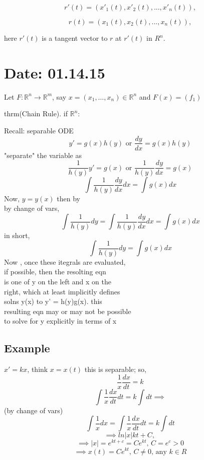   $$ r'(t) = (x'_1(t), x'_2(t), ... , x'_n(t)),$$ 
  
  $$ r(t) = (x_1(t), x_2(t), ... , x_n(t)),$$

  here $r'(t)$ is a tangent vector to $r$ at 
  $r'(t)$ in $R^n$.

\section{Date: 01.14.15}

  Let \( F: \mathbb{R}^n \to \mathbb{R}^m \), say \( x = (x_1, \dots ,
  x_n) \in \mathbb{R}^n  \) and \( F(x) = (f_1) \)

  thrm(Chain Rule). if \( \mathbb{R}^n \): 

\newpage
Recall: separable ODE
$$y' = g(x)h(y) \text{ or } \frac{dy}{dx} = g(x)h(y)$$
"separate" the variable as \\
$$\frac{1}{h(y)} y' = g(x) \text{ or }  \frac{1}{h(y)}\frac{dy}{dx} =g(x)$$
$$\int\frac{1}{h(y)} \frac{dy}{dx} dx = \int g(x)dx$$
Now, $y = y(x)$ then by  \\
by change of vars,  \\
$$\int \frac{1}{h(y)} dy = \int \frac{1}{h(y)} \frac{dy}{dx} dx = \int g(x)dx $$
in short,  \\
$$\int \frac{1}{h(y)} dy = \int g(x)dx$$
Now , once these itegrals are evaluated, \\
if possible, then the resolting eqn \\
is one of y on the left and x on the \\
right, which at least implicitly defines  \\
solns y(x) to y' = h(y)g(x). this  \\
resulting eqn may or may not be possible  \\
to solve for y explicitly in terms of x \\

\subsection*{Example}
$x'=kx$, think $x=x(t)$
this is separable; so, 
$$\frac{1}{x} \frac{dx}{dt} = k$$
$$\int \frac{1}{x} \frac{dx}{dt} dt = k \int dt \implies $$
(by change of vars)
$$\int \frac{1}{x} dx = \int \frac{1}{x} \frac{dx}{dt} dt = k\int dt$$
$$\implies ln|x| kt + C \text{, }$$ 
$$\implies |x| = e^{kt+c} = Ce^{kt} \text{, } C=e^c >0$$  
$$\implies x(t) = Ce^{kt}\text{, } C  \neq 0\text{, any }k \in R$$ 

